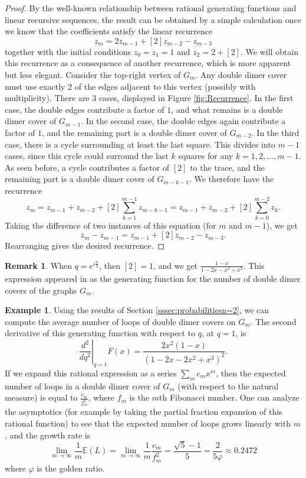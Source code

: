 \documentclass[12pt, reqno]{amsart}
\theoremstyle{definition}
\newtheorem{rema}[theo]{Remark}
\newtheorem{exam}[theo]{Example}
\newcommand{\E}{\mathbb{E}}%
\begin{document}
\begin {proof}
By the well-known relationship between rational generating functions and linear recursive sequences, the result can be obtained by a simple calculation   once we know that the coefficients satisfy the linear recurrence
$$ 
z_m = 2 z_{m-1} + [2] z_{m-2} - z_{m-3}
$$
together with the initial conditions $z_0 = z_1 = 1$ and $z_2 = 2 + [2]$.   We will obtain this recurrence as a consequence of another recurrence, which is more apparent but less elegant.   Consider the top-right vertex of $G_m$. Any double dimer cover must use exactly 2 of the edges adjacent to this vertex (possibly with multiplicity).   There are 3 cases, displayed in Figure \ref{fig:Recurrence}.    In the first case, the double edges contribute a factor of $1$, and what remains is a double dimer cover of $G_{m-1}$.    In the second case, the double edges again contribute a factor of $1$, and the remaining part is a double dimer cover of $G_{m-2}$.   In the third case, there is a cycle surrounding at least the last square. This divides into $m-1$ cases, since this cycle could surround   the last $k$ squares for any $k=1,2,\dots,m-1$. As seen before, a cycle contributes a factor of $[2]$ to the trace,  and the remaining part is a   double dimer cover of $G_{m-k-1}$. We therefore have the recurrence
$$ 
z_m = z_{m-1} + z_{m-2} + [2] \sum_{k=1}^{m-1} z_{m-k-1} = z_{m-1} + z_{m-2} + [2] \sum_{k=0}^{m-2} z_k. 
$$
Taking the difference of two instances of this equation (for $m$ and $m-1$), we get
$$ 
z_m - z_{m-1} = z_{m-1} + [2] z_{m-2} - z_{m-3}. 
$$
Rearranging gives the desired recurrence.
\end {proof}

\begin {rema} \label{rmk:uniform_gf}
When $q = e^{i\frac{\pi}{3}}$, then $[2] = 1$, and we get $\frac{1-x}{1-2x-x^2+x^3}$. This expression appeared in \cite{mosz_23} as the generating function  for the number of double dimer covers of the graphs $G_m$.
\end {rema}

\begin {exam}
Using the results of Section \ref{sssec:probabilitiesn=2}, we can compute the average number of loops of double dimer covers on $G_m$. The second derivative of this generating function with respect to $q$, at $q=1$, is
$$ 
\left. \frac{d^2}{dq^2} \right|_{q=1} F(x) = \frac{2x^2(1-x)}{(1-2x-2x^2+x^3)^2}. 
$$
If we expand this rational expression as a series $\sum_m c_m x^m$, then the expected number of loops in a double dimer cover of $G_m$   (with respect to the natural measure)   is equal to $\frac{c_m}{f_m^2}$, where $f_m$ is the $m$th Fibonacci number. One can analyze the asymptotics (for example by taking the partial fraction expansion of this rational function) to see that the expected number of loops grows linearly with $m$, and the growth rate is
$$ 
\lim_{m \to \infty} \frac{1}{m} \E(L) = \lim_{m \to \infty} \frac{1}{m}\frac{c_m}{f_m^2} = \frac{\sqrt{5}-1}{5} = \frac{2}{5 \varphi} \approx 0.2472 
$$
where $\varphi$ is the golden ratio.
\end {exam}
\end{document}

